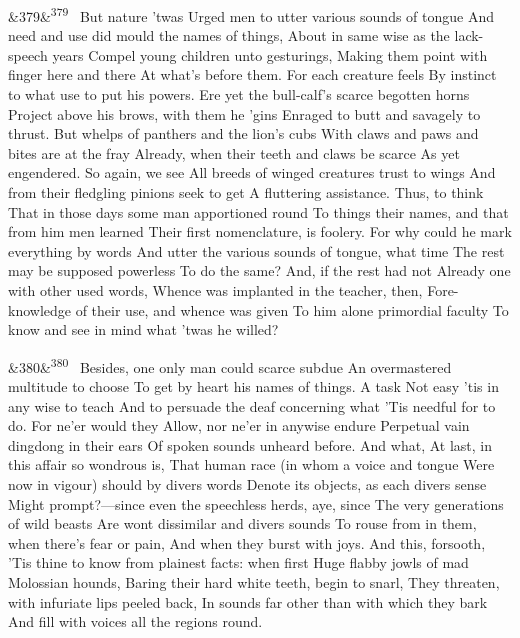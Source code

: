 \documentclass[12pt]{article}
\newcommand{\para}[1][]{\par\noindent\ifx&#1&\else\textsuperscript{\footnotesize #1}~\fi}
\begin{document}
\para[379] But nature 'twas Urged men to utter various sounds of tongue And need and use did mould the names of things, About in same wise as the lack-speech years Compel young children unto gesturings, Making them point with finger here and there At what's before them. For each creature feels By instinct to what use to put his powers. Ere yet the bull-calf's scarce begotten horns Project above his brows, with them he 'gins Enraged to butt and savagely to thrust. But whelps of panthers and the lion's cubs With claws and paws and bites are at the fray Already, when their teeth and claws be scarce As yet engendered. So again, we see All breeds of winged creatures trust to wings And from their fledgling pinions seek to get A fluttering assistance. Thus, to think That in those days some man apportioned round To things their names, and that from him men learned Their first nomenclature, is foolery. For why could he mark everything by words And utter the various sounds of tongue, what time The rest may be supposed powerless To do the same? And, if the rest had not Already one with other used words, Whence was implanted in the teacher, then, Fore-knowledge of their use, and whence was given To him alone primordial faculty To know and see in mind what 'twas he willed?

\para[380] Besides, one only man could scarce subdue An overmastered multitude to choose To get by heart his names of things. A task Not easy 'tis in any wise to teach And to persuade the deaf concerning what 'Tis needful for to do. For ne'er would they Allow, nor ne'er in anywise endure Perpetual vain dingdong in their ears Of spoken sounds unheard before. And what, At last, in this affair so wondrous is, That human race (in whom a voice and tongue Were now in vigour) should by divers words Denote its objects, as each divers sense Might prompt?---since even the speechless herds, aye, since The very generations of wild beasts Are wont dissimilar and divers sounds To rouse from in them, when there's fear or pain, And when they burst with joys. And this, forsooth, 'Tis thine to know from plainest facts: when first Huge flabby jowls of mad Molossian hounds, Baring their hard white teeth, begin to snarl, They threaten, with infuriate lips peeled back, In sounds far other than with which they bark And fill with voices all the regions round.
\end{document}
